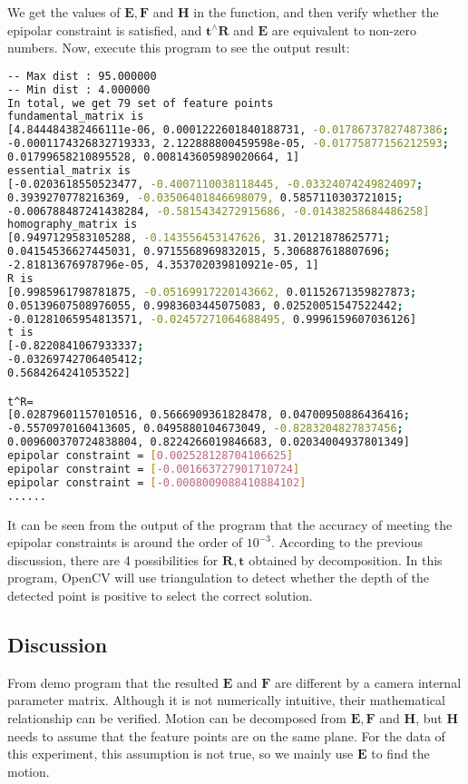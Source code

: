 We get the values of $\mathbf{E}, \mathbf{F}$ and $\mathbf{H}$ in the function, and then verify whether the epipolar constraint is satisfied, and $\mathbf{t}^ \wedge \mathbf{R}$ and $\mathbf{E}$ are equivalent to non-zero numbers. Now, execute this program to see the output result:
\begin{lstlisting}[language=sh,caption=Terminal Input：]
% build/pose_estimation_2d2d 1.png 2.png
-- Max dist : 95.000000 
-- Min dist : 4.000000 
In total, we get 79 set of feature points
fundamental_matrix is 
[4.844484382466111e-06, 0.0001222601840188731, -0.01786737827487386;
-0.0001174326832719333, 2.122888800459598e-05, -0.01775877156212593;
0.01799658210895528, 0.008143605989020664, 1]
essential_matrix is 
[-0.0203618550523477, -0.4007110038118445, -0.03324074249824097;
0.3939270778216369, -0.03506401846698079, 0.5857110303721015;
-0.006788487241438284, -0.5815434272915686, -0.01438258684486258]
homography_matrix is 
[0.9497129583105288, -0.143556453147626, 31.20121878625771;
0.04154536627445031, 0.9715568969832015, 5.306887618807696;
-2.81813676978796e-05, 4.353702039810921e-05, 1]
R is 
[0.9985961798781875, -0.05169917220143662, 0.01152671359827873;
0.05139607508976055, 0.9983603445075083, 0.02520051547522442;
-0.01281065954813571, -0.02457271064688495, 0.9996159607036126]
t is 
[-0.8220841067933337;
-0.03269742706405412;
0.5684264241053522]

t^R=
[0.02879601157010516, 0.5666909361828478, 0.04700950886436416;
-0.5570970160413605, 0.0495880104673049, -0.8283204827837456;
0.009600370724838804, 0.8224266019846683, 0.02034004937801349]
epipolar constraint = [0.002528128704106625]
epipolar constraint = [-0.001663727901710724]
epipolar constraint = [-0.0008009088410884102]
......
\end{lstlisting}

It can be seen from the output of the program that the accuracy of meeting the epipolar constraints is around the order of $10 ^{-3}$. According to the previous discussion, there are 4 possibilities for $\mathbf{R}, \mathbf{t}$ obtained by decomposition. In this program, OpenCV will use triangulation to detect whether the depth of the detected point is positive to select the correct solution.

\subsection*{Discussion}
From demo program that the resulted $\mathbf{E}$ and $\mathbf{F}$ are different by a camera internal parameter matrix. Although it is not numerically intuitive, their mathematical relationship can be verified. Motion can be decomposed from $\mathbf{E}, \mathbf{F}$ and $\mathbf{H}$, but $\mathbf{H}$ needs to assume that the feature points are on the same plane. For the data of this experiment, this assumption is not true, so we mainly use $\mathbf{E}$ to find the motion.

